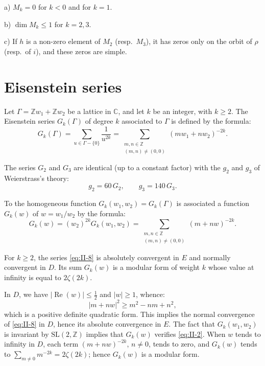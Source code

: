 \begin{corollary}\label{cor:II-dim}
a) $M_{k}=0$ for $k<0$ and for $k=1$.

b) $\dim M_{k}\leq 1$ for $k=2,3$.

c) If $h$ is a non-zero element of $M_{2}$ (resp.\ $M_{3}$), it has zeros
only on the orbit of $\rho$ (resp.\ of $i$), and these zeros are simple.
\end{corollary}

\section{Eisenstein series}\label{sec:II-eisenstein}

Let $\Gamma=\mathbb{Z}w_{1}+\mathbb{Z}w_{2}$ be a lattice in
$\mathbb{C}$, and let $k$ be an integer, with $k\geq 2$. The Eisenstein
series $G_{k}(\Gamma)$ of degree $k$ associated to $\Gamma$ is defined by
the formula:
\[
G_{k}(\Gamma)=\sum_{u\in\Gamma-\{0\}}\frac{1}{u^{2k}}
=\!\!\sum_{\substack{m,n\in\mathbb{Z}\\(m,n)\neq(0,0)}}\!\!
(mw_{1}+nw_{2})^{-2k}.
\tag{6}\label{eq:II-6}
\]

The series $G_{2}$ and $G_{3}$ are identical (up to a constant factor)
with the $g_{2}$ and $g_{3}$ of Weierstrass's theory:
\[
g_{2}=60\,G_{2},\qquad g_{3}=140\,G_{3}.
\]

To the homogeneous function $G_{k}(w_{1},w_{2})=G_{k}(\Gamma)$ is
associated a function $G_{k}(w)$ of $w=w_{1}/w_{2}$ by the formula:
\[
G_{k}(w)=(w_{2})^{2k}G_{k}(w_{1},w_{2})
=\sum_{\substack{m,n\in\mathbb{Z}\\(m,n)\neq(0,0)}}(m+nw)^{-2k}.
\tag{8}\label{eq:II-8}
\]

\begin{proposition}\label{prop:II-8}
For $k\geq 2$, the series \eqref{eq:II-8} is absolutely convergent in $E$
and normally convergent in $D$. Its sum $G_{k}(w)$ is a modular form of
weight $k$ whose value at infinity is equal to $2\zeta(2k)$.
\end{proposition}

In $D$, we have $|\operatorname{Re}(w)|\leq\frac{1}{2}$ and
$|w|\geq 1$, whence:
\[
|m+nw|^{2}\geq m^{2}-nm+n^{2},
\]
which is a positive definite quadratic form. This implies the normal
convergence of \eqref{eq:II-8} in $D$, hence its absolute convergence in
$E$. The fact that $G_{k}(w_{1},w_{2})$ is invariant by
$\mathrm{SL}(2,\mathbb{Z})$ implies that $G_{k}(w)$ verifies
\eqref{eq:II-2}. When $w$ tends to infinity in $D$, each term
$(m+nw)^{-2k}$, $n\neq 0$, tends to zero, and $G_{k}(w)$ tends to
$\sum_{m\neq 0}m^{-2k}=2\zeta(2k)$; hence $G_{k}(w)$ is a modular form.

